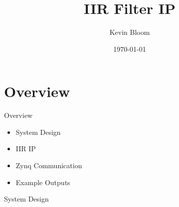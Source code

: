 \documentclass{beamer}
\title{IIR Filter IP}
\date{\today}
\author{Kevin Bloom}
\institute{Pennsylvania College of Technology}
\begin{document}
\maketitle

\section{Overview}
\begin{frame}{Overview}
  \begin{itemize}[<+>]
  \item System Design
  \item IIR IP
  \item Zynq Communication
  \item Example Outputs
  \end{itemize}
\end{frame}

\begin{frame}{System Design}
\end{frame}
\end{document}
